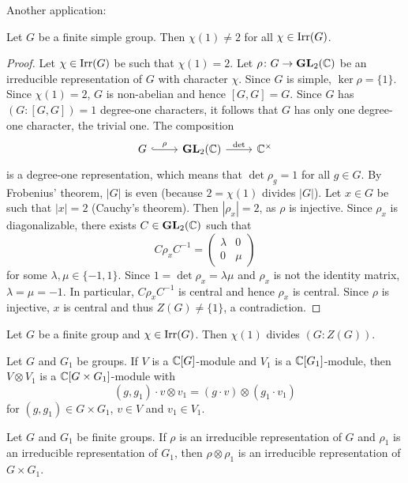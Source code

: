 Another application:

\begin{theorem}
    Let $G$ be a finite simple group. 
    Then $\chi(1)\ne2$ for all $\chi\in\operatorname{Irr}(G)$. 
\end{theorem}

\begin{proof}
    Let $\chi\in\operatorname{Irr}(G)$ be such that $\chi(1)=2$. Let $\rho\colon G\to\mathbf{GL}_2(\mathbb{C})$
    be an irreducible representation of $G$ with character $\chi$. Since 
    $G$ is simple, $\ker\rho=\{1\}$. Since $\chi(1)=2$, 
    $G$ is non-abelian and hence $[G,G]=G$. Since 
    $G$ has $(G:[G,G])=1$ degree-one characters, it follows that
    $G$ has only one degree-one character, the trivial one. The composition
    \[
    \begin{tikzcd}
    	G & {\GL_2(\C)} & {\C^{\times}}
    	\arrow["{\rho }", hook, from=1-1, to=1-2]
    	\arrow["{\det }", from=1-2, to=1-3]
    \end{tikzcd}
    \]
    is a degree-one representation, which means that $\det\rho_g=1$ for all $g\in G$. 
    By Frobenius' theorem, $|G|$ is even (because 
    $2=\chi(1)$ divides $|G|$). Let $x\in G$ be such that $|x|=2$ (Cauchy's theorem). 
    Then $|\rho_x|=2$, as $\rho$ is injective. Since $\rho_x$ is diagonalizable, 
    there exists $C\in\mathbf{GL}_2(\mathbb{C})$ such that
    \[
    C\rho_xC^{-1}=\begin{pmatrix}
    \lambda&0\\
    0&\mu
    \end{pmatrix}
    \]
    for some $\lambda,\mu\in\{-1,1\}$. Since $1=\det\rho_x=\lambda\mu$ and
    $\rho_x$ is not the identity matrix, $\lambda=\mu=-1$. In particular, $C\rho_xC^{-1}$ is central
    and hence $\rho_x$ is central. Since $\rho$ is injective, $x$ is central 
    and thus $Z(G)\ne\{1\}$, a contradiction. 
\end{proof}


\begin{theorem}[Schur]
\label{thm:Schur_chi(1)}
    Let $G$ be a finite group and $\chi\in\operatorname{Irr}(G)$. 
    Then $\chi(1)$ divides $(G:Z(G))$. 
\end{theorem}

Let $G$ and $G_1$ be groups. If $V$ is a $\mathbb{C}[G]$-module and 
$V_1$ is a $\mathbb{C}[G_1]$-module, then 
$V\otimes V_1$ is a $\mathbb{C}[G\times G_1]$-module 
with 
\[
(g,g_1)\cdot v\otimes v_1=(g\cdot v)\otimes (g_1\cdot v_1)
\]
for $(g,g_1)\in G\times G_1$, $v\in V$ and $v_1\in V_1$. 

\begin{lemma}
    Let $G$ and $G_1$ be finite groups. If $\rho$ is an irreducible
    representation of $G$ and $\rho_1$ is an irreducible representation
    of $G_1$, then 
    $\rho\otimes\rho_1$ is an irreducible representation of $G\times G_1$. 
\end{lemma}

